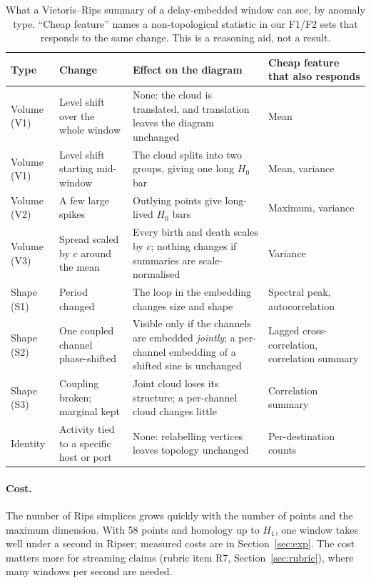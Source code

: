 \begin{table}[ht]
\centering\small
\caption{What a Vietoris--Rips summary of a delay-embedded window can see, by anomaly type. ``Cheap feature'' names a non-topological statistic in our F1/F2 sets that responds to the same change. This is a reasoning aid, not a result.}
\label{tab:see}
\begin{tabularx}{\linewidth}{@{}L{2.3cm}L{2.6cm}YL{2.8cm}@{}}
\toprule
Type & Change & Effect on the diagram & Cheap feature that also responds \\
\midrule
Volume (V1) & Level shift over the whole window & None: the cloud is translated, and translation leaves the diagram unchanged & Mean \\
Volume (V1) & Level shift starting mid-window & The cloud splits into two groups, giving one long $H_0$ bar & Mean, variance \\
Volume (V2) & A few large spikes & Outlying points give long-lived $H_0$ bars & Maximum, variance \\
Volume (V3) & Spread scaled by $c$ around the mean & Every birth and death scales by $c$; nothing changes if summaries are scale-normalised & Variance \\
Shape (S1) & Period changed & The loop in the embedding changes size and shape & Spectral peak, autocorrelation \\
Shape (S2) & One coupled channel phase-shifted & Visible only if the channels are embedded \emph{jointly}; a per-channel embedding of a shifted sine is unchanged & Lagged cross-correlation, correlation summary \\
Shape (S3) & Coupling broken; marginal kept & Joint cloud loses its structure; a per-channel cloud changes little & Correlation summary \\
Identity & Activity tied to a specific host or port & None: relabelling vertices leaves topology unchanged & Per-destination counts \\
\bottomrule
\end{tabularx}
\end{table}

\paragraph{Cost.} The number of Rips simplices grows quickly with the number of points and the maximum dimension. With 58 points and homology up to $H_1$, one window takes well under a second in Ripser; measured costs are in Section~\ref{sec:exp}. The cost matters more for streaming claims (rubric item R7, Section~\ref{sec:rubric}), where many windows per second are needed.
